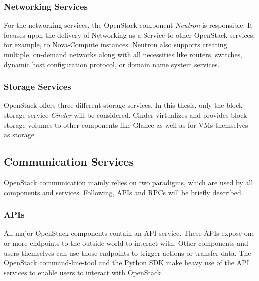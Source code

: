                  
             \subsubsection{Networking Services}
             
                For the networking services, the OpenStack component \textsl{Neutron} is responsible.
                It focuses upon the delivery of Networking-as-a-Service to other OpenStack services, for example, to Nova-Compute instances.
                Neutron also supports creating multiple, on-demand networks along with all necessities like routers, switches, dynamic host configuration protocol, or domain name system services.
                 
                 
             \subsubsection{Storage Services}
                 
                OpenStack offers three different storage services.
                In this thesis, only the block-storage service \textsl{Cinder} will be considered.
                Cinder virtualizes and provides block-storage volumes to other components like Glance as well as for VMs themselves as storage.
                 

            
        \subsection{Communication Services}
            
            OpenStack communication mainly relies on two paradigms, which are used by all components and services.
            Following, \acp{API} and \acp{RPC} will be briefly described.
            
            \subsubsection{\acp{API}}
                
                All major OpenStack components contain an \ac{API} service.
                These \acp{API} expose one or more endpoints to the outside world to interact with.
                Other components and users themselves can use those endpoints to trigger actions or transfer data.
                The OpenStack command-line-tool and the Python \ac{SDK} make heavy use of the \ac{API} services to enable users to interact with OpenStack.
                
